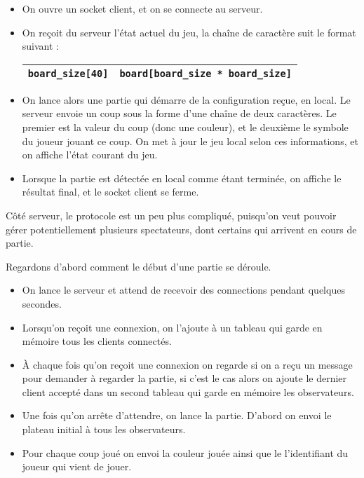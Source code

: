 \documentclass[a4paper]{article}
\begin{document}
%
\begin{itemize}
	\setlength\itemsep{1em}
	\item On ouvre un socket client, et on se connecte au serveur.
	\item On reçoit du serveur l'état actuel du jeu, la chaîne de caractère suit le format suivant :

		\bgroup
		\def\arraystretch{1.5}
		\begin{center}
		\begin{tabular}{|c|c|}
			\hline 
			\texttt{board\_size[40]} & \texttt{board[board\_size * board\_size]} \\ 
			\hline 
		\end{tabular} 	
		\end{center}
		\egroup
	
	\item On lance alors une partie qui démarre de la configuration reçue, en local. Le serveur envoie un coup sous la forme d'une chaîne de deux caractères. Le premier est la valeur du coup (donc une couleur), et le deuxième le symbole du joueur jouant ce coup. On met à jour le jeu local selon ces informations, et on affiche l'état courant du jeu. 
	\item Lorsque la partie est détectée en local comme étant terminée, on 
	affiche le résultat final, et le socket client se ferme. \\

\end{itemize}
%


Côté serveur, le protocole est un peu plus compliqué, puisqu'on veut pouvoir 
gérer potentiellement plusieurs spectateurs, dont certains qui arrivent en 
cours de partie.

Regardons d'abord comment le début d'une partie se déroule.
\begin{itemize}
	\item On lance le serveur et attend de recevoir des connections pendant 
	quelques secondes.
	\item Lorsqu'on reçoit une connexion, on l'ajoute à un tableau qui garde en 
	mémoire tous les clients connectés.
	\item À chaque fois qu'on reçoit une connexion on regarde si on a reçu un 
	message pour demander à regarder la partie, si c'est le cas alors on ajoute 
	le dernier client accepté dans un second tableau qui garde en mémoire les 
	observateurs.
	\item Une fois qu'on arrête d'attendre, on lance la partie. D'abord on 
	envoi le plateau initial à tous les observateurs.
	\item Pour chaque coup joué on envoi la couleur jouée ainsi que le 
	l'identifiant du joueur qui vient de jouer.
\end{itemize}
\end{document}
